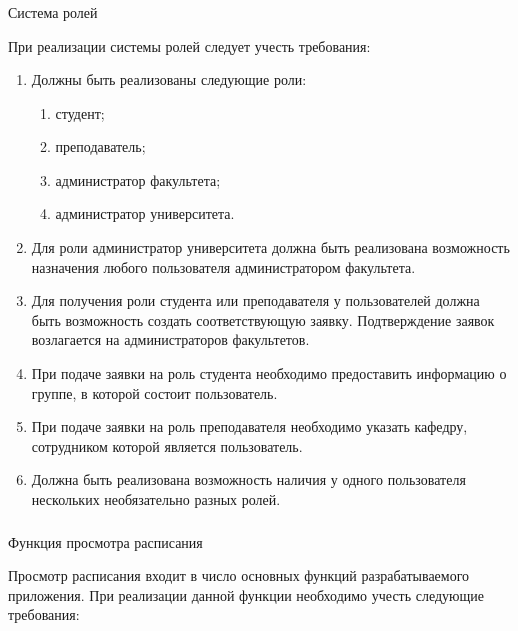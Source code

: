 \subsubsection{} Система ролей
\label{sec:domain:specification:roles}

При реализации системы ролей следует учесть требования:

\begin{enumerate}
	\item Должны быть реализованы следующие роли:
	\begin{enumerate}
		\item студент;
		\item преподаватель;
		\item администратор факультета;
		\item администратор университета.
	\end{enumerate}
	\item Для роли администратор университета должна быть реализована возможность назначения любого пользователя администратором факультета.
	\item Для получения роли студента или преподавателя у пользователей дол\-ж\-на быть возможность создать соответствующую заявку. Подтверждение заявок возлагается на администраторов факультетов.
	\item При подаче заявки на роль студента необходимо предоставить информацию о группе, в которой состоит пользователь.
	\item При подаче заявки на роль преподавателя необходимо указать кафедру, сотрудником которой является пользователь.
	\item Должна быть реализована возможность наличия у одного пользователя нескольких необязательно разных ролей.
\end{enumerate}

\subsubsection{} Функция просмотра расписания
\label{sec:domain:specification:agenda}

Просмотр расписания входит в число основных функций разрабатываемого приложения. При реализации данной функции необходимо учесть следующие требования:


